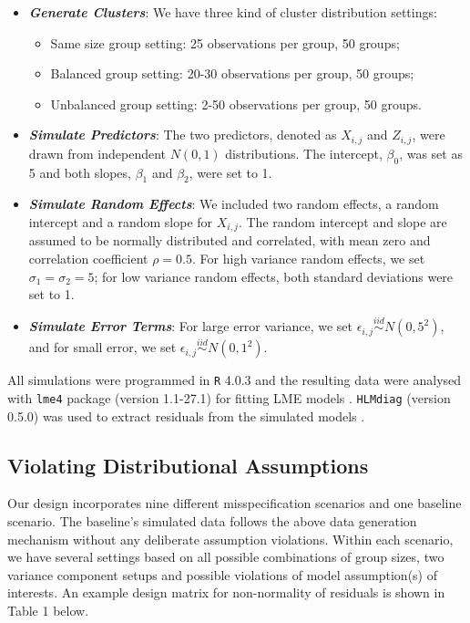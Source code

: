 \documentclass[12pt]{article}
\providecommand{\tightlist}{%
  \setlength{\itemsep}{0pt}\setlength{\parskip}{0pt}}
\begin{document}
\begin{itemize}
\item
  \textbf{\emph{Generate Clusters}}: We have three kind of cluster
  distribution settings:

  \begin{itemize}
  \tightlist
  \item
    Same size group setting: 25 observations per group, 50 groups;
  \item
    Balanced group setting: 20-30 observations per group, 50 groups;
  \item
    Unbalanced group setting: 2-50 observations per group, 50 groups.
  \end{itemize}
\item
  \textbf{\emph{Simulate Predictors}}: The two predictors, denoted as
  \(X_{i,j}\) and \(Z_{i,j}\), were drawn from independent \(N(0,1)\)
  distributions. The intercept, \(\beta_0\), was set as 5 and both
  slopes, \(\beta_1\) and \(\beta_2\), were set to 1.
\item
  \textbf{\emph{Simulate Random Effects}}: We included two random
  effects, a random intercept and a random slope for \(X_{i,j}\). The
  random intercept and slope are assumed to be normally distributed and
  correlated, with mean zero and correlation coefficient \(\rho = 0.5\).
  For high variance random effects, we set \(\sigma_1 = \sigma_2 = 5\);
  for low variance random effects, both standard deviations were set to
  1.
\item
  \textbf{\emph{Simulate Error Terms}}: For large error variance, we set
  \(\epsilon_{i,j}\overset{iid}\sim N(0,5^2)\), and for small error, we
  set \(\epsilon_{i,j}\overset{iid}\sim N(0,1^2)\).
\end{itemize}

All simulations were programmed in \texttt{R} 4.0.3 \citep{Rteam} and
the resulting data were analysed with \texttt{lme4} package (version
1.1-27.1) for fitting LME models \citep{Bates2015}. \texttt{HLMdiag}
(version 0.5.0) was used to extract residuals from the simulated models
\citep{loy2014hlmdiag}.

\subsection{Violating Distributional Assumptions}

Our design incorporates nine different misspecification scenarios and
one baseline scenario. The baseline's simulated data follows the above
data generation mechanism without any deliberate assumption violations.
Within each scenario, we have several settings based on all possible
combinations of group sizes, two variance component setups and possible
violations of model assumption(s) of interests. An example design matrix
for non-normality of residuals is shown in Table 1 below.
\end{document}

